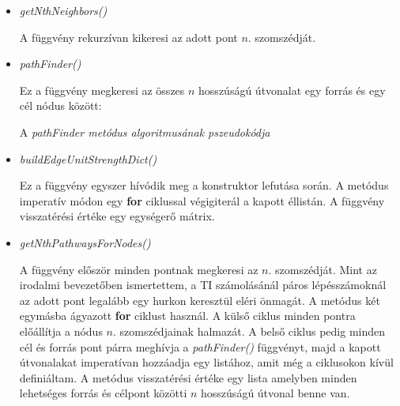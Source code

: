 \documentclass[a4paper,12pt]{article}
\newenvironment{imgdesc}{
		\small
		\singlespacing
		\begin{center}

	}{
		\end{center}
	}
\begin{document}
		\begin{itemize}
			\item \textit{getNthNeighbors()}

			A függvény rekurzívan kikeresi az adott pont $n$. szomszédját.

			\item \textit{pathFinder()}

			Ez a függvény megkeresi az összes $n$ hosszúságú útvonalat egy forrás és egy cél nódus között:

			  		\begin{algorithm}[H]
						\footnotesize

						\SetAlgoVlined



			  		\end{algorithm}

			  		\begin{imgdesc}
			  			A \textit{pathFinder metódus algoritmusának pszeudokódja}
			  		\end{imgdesc}

			\item \textit{buildEdgeUnitStrengthDict()}

			Ez a függvény egyszer hívódik meg a konstruktor lefutása során. A metódus imperatív módon egy \textbf{for} ciklussal végigiterál a kapott éllistán. A függvény visszatérési értéke egy egységerő mátrix.

			\item \textit{getNthPathwaysForNodes()}

			A függvény először minden pontnak megkeresi az $n$. szomszédját.  Mint az irodalmi bevezetőben ismertettem, a TI számolásánál páros lépésszámoknál az adott pont legalább egy hurkon keresztül eléri önmagát. A metódus két egymásba ágyazott \textbf{for} ciklust használ. A külső ciklus minden pontra előállítja a nódus $n$. szomszédjainak halmazát. A belső ciklus pedig minden cél és forrás pont párra meghívja a \textit{pathFinder()} függvényt, majd a kapott útvonalakat imperatívan hozzáadja egy listához, amit még a ciklusokon kívül definiáltam. A metódus visszatérési értéke egy lista amelyben minden lehetséges forrás és célpont közötti $n$ hosszúságú útvonal benne van.


\end{itemize}
\end{document}
